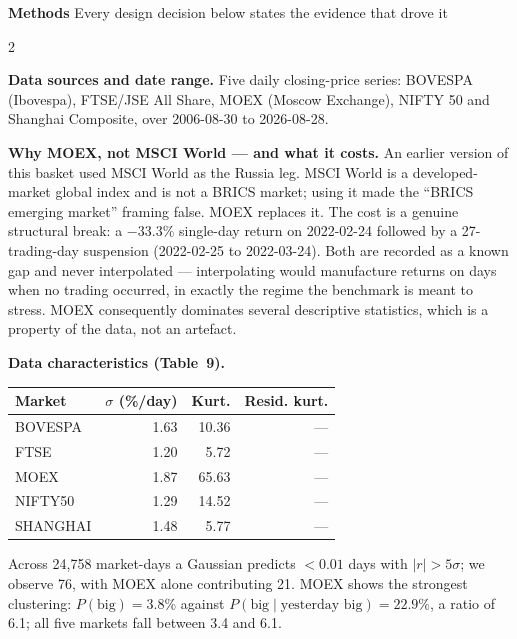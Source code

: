 \documentclass[10pt]{article}
\begin{document}
\clearpage

\begin{tcolorbox}[
  colback=NavyBg, colframe=NavyBg!60!black, arc=4pt,
  left=8pt, right=8pt, top=4pt, bottom=4pt,
  before skip=0pt, after skip=10pt]
{\large\bfseries\color{Navy} Methods}
\hfill{\small\color{Navy!70} Every design decision below states the evidence that drove it}
\end{tcolorbox}

\begin{multicols}{2}
\small

\textbf{Data sources and date range.}
Five daily closing-price series: BOVESPA (Ibovespa), FTSE/JSE All Share, MOEX (Moscow Exchange), NIFTY 50 and Shanghai Composite, over 2006-08-30 to 2026-08-28.

\smallskip
\textbf{Why MOEX, not MSCI World --- and what it costs.}
An earlier version of this basket used MSCI World as the Russia leg. MSCI World is a developed-market global index and is not a BRICS market; using it made the ``BRICS emerging market'' framing false. MOEX replaces it. The cost is a genuine structural break: a $-33.3\%$ single-day return on 2022-02-24 followed by a 27-trading-day suspension (2022-02-25 to 2022-03-24). Both are recorded as a known gap and never interpolated --- interpolating would manufacture returns on days when no trading occurred, in exactly the regime the benchmark is meant to stress. MOEX consequently dominates several descriptive statistics, which is a property of the data, not an artefact.

\smallskip
\textbf{Data characteristics (Table~9).}

\begin{tabular}{@{}lrrr@{}}
\toprule
Market & $\sigma$ (\%/day) & Kurt. & Resid. kurt. \\
\midrule
BOVESPA & 1.63 & 10.36 & --- \\
FTSE & 1.20 & 5.72 & --- \\
MOEX & 1.87 & 65.63 & --- \\
NIFTY50 & 1.29 & 14.52 & --- \\
SHANGHAI & 1.48 & 5.77 & --- \\
\bottomrule
\end{tabular}

\smallskip
Across 24,758 market-days a Gaussian predicts $<0.01$ days with $|r|>5\sigma$; we observe 76, with MOEX alone contributing 21. MOEX shows the strongest clustering: $P(\text{big})=3.8\%$ against $P(\text{big}\mid\text{yesterday big})=22.9\%$, a ratio of 6.1; all five markets fall between 3.4 and 6.1.


\end{multicols}
\end{document}
